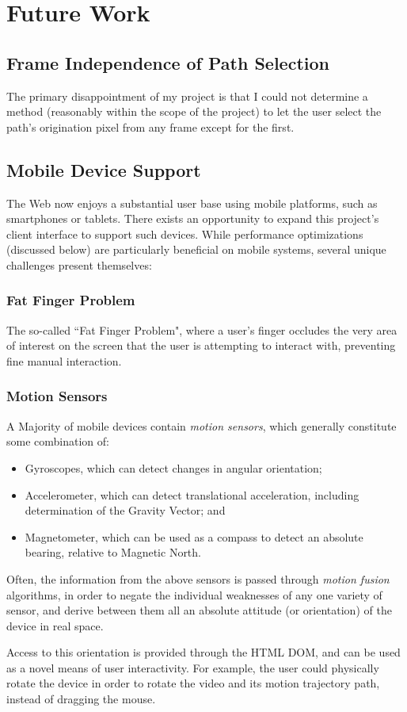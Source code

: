 
\chapter{Future Work}


\section{Frame Independence of Path Selection}
The primary disappointment of my project is that I could not determine a method (reasonably within the scope of the project) to let the user select the path's origination pixel from any frame except for the first.


\section{Mobile Device Support}
The Web now enjoys a substantial user base using mobile platforms, such as smartphones or tablets. There exists an opportunity to expand this project's client interface to support such devices. While performance optimizations (discussed below) are particularly beneficial on mobile systems, several unique challenges present themselves:


\subsection{Fat Finger Problem}
    The so-called ``Fat Finger Problem", where a user's finger occludes the very area of interest on the screen that the user is attempting to interact with, preventing fine manual interaction.

\subsection{Motion Sensors}
    A Majority of mobile devices contain \emph{motion sensors}, which generally constitute some combination of:
    \begin{itemize}
    \item Gyroscopes, which can detect changes in angular orientation;
    \item Accelerometer, which can detect translational acceleration, including determination of the Gravity Vector; and
    \item Magnetometer, which can be used as a compass to detect an absolute bearing, relative to Magnetic North.
    \end{itemize}
    Often, the information from the above sensors is passed through \emph{motion fusion} algorithms, in order to negate the individual weaknesses of any one variety of sensor, and derive between them all an absolute attitude (or orientation) of the device in real space.\par
    Access to this orientation is provided through the HTML DOM, and can be used as a novel means of user interactivity. For example, the user could physically rotate the device in order to rotate the video and its motion trajectory path, instead of dragging the mouse.



